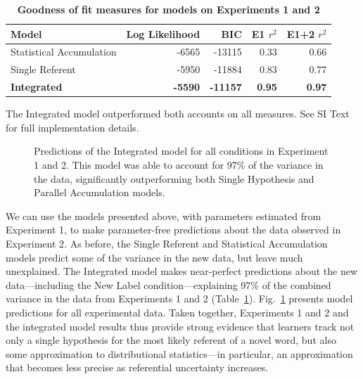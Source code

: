 \documentclass{pnastwo}
\begin{document}
\begin{article}
\begin{table}[tb]
\centering
\caption{\textbf{Goodness of fit measures for models on Experiments 1 and 2}}
\label{tab:model}
\begin{tabular}{lrrrr}
  Model & Log Likelihood & BIC & E1 $r^{2}$ & E1+2 $r^{2}$ \\ 
  \hline
  Statistical Accumulation & -6565 & -13115 & 0.33 & 0.66 \\ 
  Single Referent & -5950 & -11884 & 0.83 & 0.77 \\ 
  \textbf{Integrated} & \textbf{-5590} & \textbf{-11157} & \textbf{0.95} & \textbf{0.97} \\ 
  \hline
\end{tabular}
\raggedright
The Integrated model outperformed both accounts on all measures. See SI Text for full implementation details.
\end{table}

 \begin{figure}[tb]
	\caption{\label{fig:model_fit} Predictions of the Integrated model for all conditions in Experiment 1 and 2. This model was able to account for 97\% of the variance in the data, significantly outperforming both Single Hypothesis and Parallel Accumulation models.}
\end{figure}


We can use the models presented above, with parameters estimated from Experiment 1, to make parameter-free predictions about the data observed in Experiment 2. As before, the Single Referent and Statistical Accumulation models predict some of the variance in the new data, but leave much unexplained. The Integrated model makes near-perfect predictions about the new data---including the New Label condition---explaining 97\% of the combined variance in the data from Experiments 1 and 2 (Table~\ref{tab:model}). Fig.~\ref{fig:model_fit} presents model predictions for all experimental data. Taken together, Experiments 1 and 2 and the integrated model results thus provide strong evidence that learners track not only a single hypothesis for the most likely referent of a novel word, but also some approximation to distributional statistics---in particular, an approximation that becomes less precise as referential uncertainty increases.


\end{article}
\end{document}
